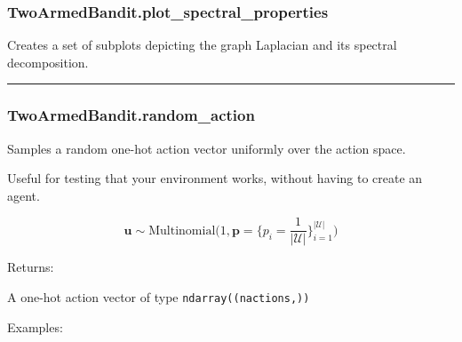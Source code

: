 \subsubsection{TwoArmedBandit.plot\_spectral\_properties}\label{twoarmedbandit.plot_spectral_properties}

\begin{Shaded}
\begin{Highlighting}[]
\OperatorTok{=}\OperatorTok{=}\OperatorTok{=}\NormalTok{)}
\end{Highlighting}
\end{Shaded}

Creates a set of subplots depicting the graph Laplacian and its spectral
decomposition.

\begin{center}\rule{0.5\linewidth}{\linethickness}\end{center}

\subsubsection{TwoArmedBandit.random\_action}\label{twoarmedbandit.random_action}

\begin{Shaded}
\begin{Highlighting}[]
\NormalTok{)}
\end{Highlighting}
\end{Shaded}

Samples a random one-hot action vector uniformly over the action space.

Useful for testing that your environment works, without having to create
an agent.

\[
\mathbf u \sim \mathrm{Multinomial}\Big(1, \mathbf p=\{p_i = \frac{1}{|\mathcal U|}\}_{i=1}^{|\mathcal U|}\Big)
\]

Returns:

A one-hot action vector of type \texttt{ndarray((nactions,))}

Examples:

\begin{Shaded}
\begin{Highlighting}[]
\OperatorTok{=}
\end{Highlighting}
\end{Shaded}

